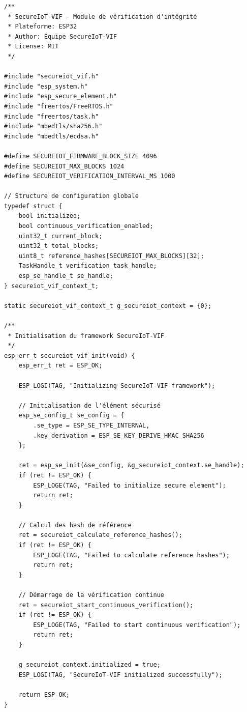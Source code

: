 \lstset{language=C}
\begin{lstlisting}[caption={Implémentation complète du module de vérification d'intégrité pour ESP32}]
/**
 * SecureIoT-VIF - Module de vérification d'intégrité
 * Plateforme: ESP32
 * Author: Équipe SecureIoT-VIF
 * License: MIT
 */

#include "secureiot_vif.h"
#include "esp_system.h"
#include "esp_secure_element.h"
#include "freertos/FreeRTOS.h"
#include "freertos/task.h"
#include "mbedtls/sha256.h"
#include "mbedtls/ecdsa.h"

#define SECUREIOT_FIRMWARE_BLOCK_SIZE 4096
#define SECUREIOT_MAX_BLOCKS 1024
#define SECUREIOT_VERIFICATION_INTERVAL_MS 1000

// Structure de configuration globale
typedef struct {
    bool initialized;
    bool continuous_verification_enabled;
    uint32_t current_block;
    uint32_t total_blocks;
    uint8_t reference_hashes[SECUREIOT_MAX_BLOCKS][32];
    TaskHandle_t verification_task_handle;
    esp_se_handle_t se_handle;
} secureiot_vif_context_t;

static secureiot_vif_context_t g_secureiot_context = {0};

/**
 * Initialisation du framework SecureIoT-VIF
 */
esp_err_t secureiot_vif_init(void) {
    esp_err_t ret = ESP_OK;
    
    ESP_LOGI(TAG, "Initializing SecureIoT-VIF framework");
    
    // Initialisation de l'élément sécurisé
    esp_se_config_t se_config = {
        .se_type = ESP_SE_TYPE_INTERNAL,
        .key_derivation = ESP_SE_KEY_DERIVE_HMAC_SHA256
    };
    
    ret = esp_se_init(&se_config, &g_secureiot_context.se_handle);
    if (ret != ESP_OK) {
        ESP_LOGE(TAG, "Failed to initialize secure element");
        return ret;
    }
    
    // Calcul des hash de référence
    ret = secureiot_calculate_reference_hashes();
    if (ret != ESP_OK) {
        ESP_LOGE(TAG, "Failed to calculate reference hashes");
        return ret;
    }
    
    // Démarrage de la vérification continue
    ret = secureiot_start_continuous_verification();
    if (ret != ESP_OK) {
        ESP_LOGE(TAG, "Failed to start continuous verification");
        return ret;
    }
    
    g_secureiot_context.initialized = true;
    ESP_LOGI(TAG, "SecureIoT-VIF initialized successfully");
    
    return ESP_OK;
}


\end{lstlisting}
